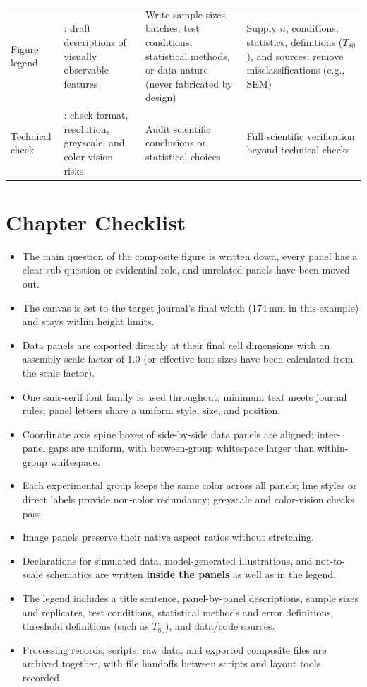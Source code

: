 \begin{table}[htbp]
\begin{tabularx}{\linewidth}{@{}>{\raggedright\arraybackslash}p{20mm}YYY@{}}
Figure legend & : draft descriptions of visually observable features & Write sample sizes, batches, test conditions, statistical methods, or data nature (never fabricated by design) & Supply $n$, conditions, statistics, definitions ($T_{80}$), and sources; remove misclassifications (e.g., SEM) \\
Technical check & : check format, resolution, greyscale, and color-vision risks & Audit scientific conclusions or statistical choices & Full scientific verification beyond technical checks \\
\bottomrule
\end{tabularx}
\end{table}

\section{Chapter Checklist}

\begin{itemize}
\item The main question of the composite figure is written down, every panel has a clear sub-question or evidential role, and unrelated panels have been moved out.
\item The canvas is set to the target journal's final width ($174\ \text{mm}$ in this example) and stays within height limits.
\item Data panels are exported directly at their final cell dimensions with an assembly scale factor of $1.0$ (or effective font sizes have been calculated from the scale factor).
\item One sans-serif font family is used throughout; minimum text meets journal rules; panel letters share a uniform style, size, and position.
\item Coordinate axis spine boxes of side-by-side data panels are aligned; inter-panel gaps are uniform, with between-group whitespace larger than within-group whitespace.
\item Each experimental group keeps the same color across all panels; line styles or direct labels provide non-color redundancy; greyscale and color-vision checks pass.
\item Image panels preserve their native aspect ratios without stretching.
\item Declarations for simulated data, model-generated illustrations, and not-to-scale schematics are written \textbf{inside the panels} as well as in the legend.
\item The legend includes a title sentence, panel-by-panel descriptions, sample sizes and replicates, test conditions, statistical methods and error definitions, threshold definitions (such as $T_{80}$), and data/code sources.
\item Processing records, scripts, raw data, and exported composite files are archived together, with file handoffs between scripts and layout tools recorded.
\end{itemize}

